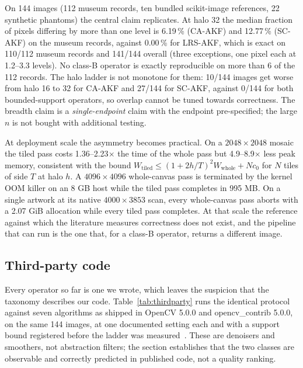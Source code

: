 \documentclass[journal]{IEEEtran}
\begin{document}
On 144 images (112 museum records, ten bundled scikit-image references, 22 synthetic phantoms) the central claim replicates. At halo 32 the median fraction of pixels differing by more than one level is 6.19\,\% (CA-AKF) and 12.77\,\% (SC-AKF) on the museum records, against 0.00\,\% for LRS-AKF, which is exact on 110/112 museum records and 141/144 overall (three exceptions, one pixel each at 1.2--3.3 levels). No class-B operator is exactly reproducible on more than 6 of the 112 records. The halo ladder is not monotone for them: 10/144 images get worse from halo 16 to 32 for CA-AKF and 27/144 for SC-AKF, against 0/144 for both bounded-support operators, so overlap cannot be tuned towards correctness. The breadth claim is a \emph{single-endpoint} claim with the endpoint pre-specified; the large \(n\) is not bought with additional testing.

At deployment scale the asymmetry becomes practical. On a \(2048\times2048\) mosaic the tiled pass costs 1.36--2.23\(\times\) the time of the whole pass but 4.9--8.9\(\times\) less peak memory, consistent with the bound \(W_{\mathrm{tiled}}\le(1+2h/T)^2W_{\mathrm{whole}}+Nc_0\) for \(N\) tiles of side \(T\) at halo \(h\). A \(4096\times4096\) whole-canvas pass is terminated by the kernel OOM killer on an 8 GB host while the tiled pass completes in 995 MB. On a single artwork at its native \(4000\times3853\) scan, every whole-canvas pass aborts with a 2.07 GiB allocation while every tiled pass completes. At that scale the reference against which the literature measures correctness does not exist, and the pipeline that can run is the one that, for a class-B operator, returns a different image.

\subsection{Third-party code}\label{third-party-code}

Every operator so far is one we wrote, which leaves the suspicion that the taxonomy describes our code. Table~\ref{tab:thirdparty} runs the identical protocol against seven algorithms as shipped in OpenCV 5.0.0 and opencv\_contrib 5.0.0, on the same 144 images, at one documented setting each and with a support bound registered before the ladder was measured~\cite{tomasi1998bilateral,he2010guided,buades2005nlm,perona1991diffusion,gastal2012amf,zhang2014rollingguidance,xu2011l0smooth}. These are denoisers and smoothers, not abstraction filters; the section establishes that the two classes are observable and correctly predicted in published code, not a quality ranking.
\end{document}

